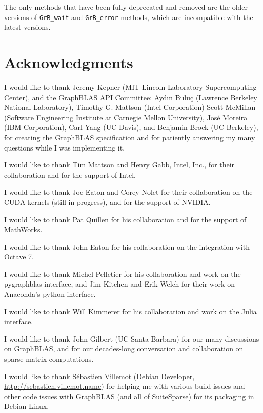 \documentclass[12pt]{article}
\begin{document}
The only methods that have been fully deprecated and removed are the older
versions of \verb'GrB_wait' and \verb'GrB_error' methods, which are
incompatible with the latest versions.

\section{Acknowledgments}

I would like to thank Jeremy Kepner (MIT Lincoln Laboratory Supercomputing
Center), and the GraphBLAS API Committee: Ayd\i n Bulu\c{c} (Lawrence Berkeley
National Laboratory), Timothy G. Mattson (Intel Corporation) Scott McMillan
(Software Engineering Institute at Carnegie Mellon University), Jos\'e Moreira
(IBM Corporation), Carl Yang (UC Davis), and Benjamin Brock (UC Berkeley), for
creating the GraphBLAS specification and for patiently answering my many
questions while I was implementing it.

I would like to thank Tim Mattson and Henry Gabb, Intel, Inc., for their
collaboration and for the support of Intel.

I would like to thank Joe Eaton and Corey Nolet for their collaboration on the
CUDA kernels (still in progress), and for the support of NVIDIA.

I would like to thank Pat Quillen for his
collaboration and for the support of MathWorks.

I would like to thank John Eaton for his collaboration on the integration
with Octave 7.

I would like to thank Michel Pelletier for his collaboration and work on the
pygraphblas interface, and Jim Kitchen and Erik Welch for their work on
Anaconda's python interface.

I would like to thank Will Kimmerer for his collaboration and work on the
Julia interface.

I would like to thank John Gilbert (UC Santa Barbara) for our many discussions
on GraphBLAS, and for our decades-long conversation and collaboration on sparse
matrix computations.

I would like to thank S\'ebastien Villemot (Debian Developer,
\url{http://sebastien.villemot.name}) for helping me with various build issues
and other code issues with GraphBLAS (and all of SuiteSparse) for its packaging
in Debian Linux.
\end{document}
